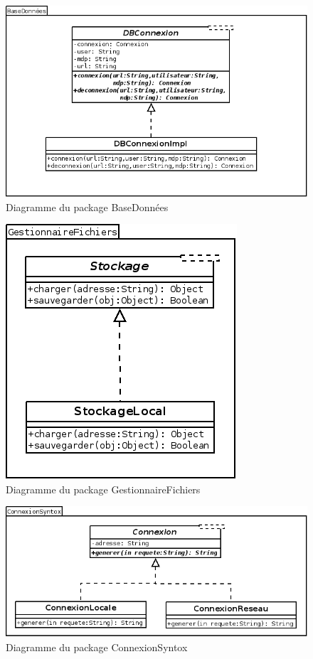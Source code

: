 \documentclass[12pt]{report}
\begin{document}
\begin{figure}[h!]
\begin{center}
\includegraphics[scale=0.5]{DiagBD.png}
\caption{Diagramme du package BaseDonnées}
\end{center}
\end{figure}

\begin{figure}[h!]
\begin{center}
\includegraphics[scale=0.5]{DiagStockage.png}
\caption{Diagramme du package GestionnaireFichiers}
\end{center}
\end{figure}


\begin{figure}[h!]
\begin{center}
\includegraphics[scale=0.5]{DiagSyntox.png}
\caption{Diagramme du package ConnexionSyntox}
\end{center}
\end{figure}
\end{document}
